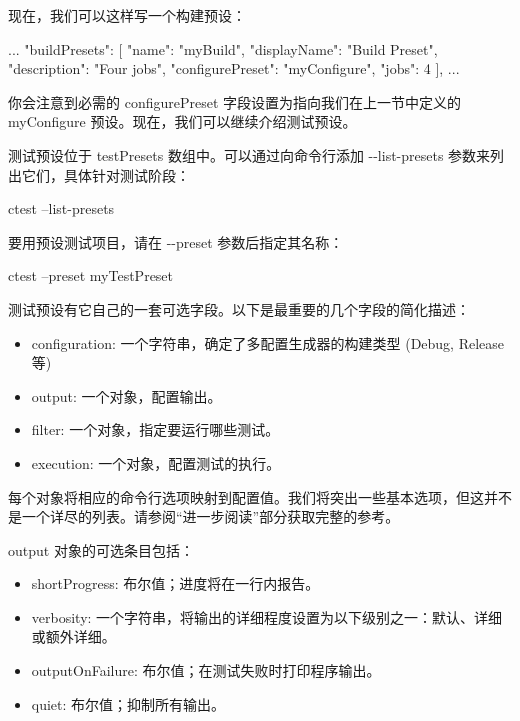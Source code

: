 现在，我们可以这样写一个构建预设：


\begin{json}
...
    "buildPresets": [
        {
            "name": "myBuild",
            "displayName": "Build Preset",
            "description": "Four jobs",
            "configurePreset": "myConfigure",
            "jobs": 4
        }
    ],
...
\end{json}

你会注意到必需的 configurePreset 字段设置为指向我们在上一节中定义的 myConfigure 预设。现在，我们可以继续介绍测试预设。


测试预设位于 testPresets 数组中。可以通过向命令行添加 -{}-list-presets 参数来列出它们，具体针对测试阶段：

\begin{shell}
ctest --list-presets
\end{shell}

要用预设测试项目，请在 -{}-preset 参数后指定其名称：

\begin{shell}
ctest --preset myTestPreset
\end{shell}

测试预设有它自己的一套可选字段。以下是最重要的几个字段的简化描述：

\begin{itemize}
\item
configuration: 一个字符串，确定了多配置生成器的构建类型 (Debug, Release等)

\item
output: 一个对象，配置输出。

\item
filter: 一个对象，指定要运行哪些测试。

\item
execution: 一个对象，配置测试的执行。
\end{itemize}

每个对象将相应的命令行选项映射到配置值。我们将突出一些基本选项，但这并不是一个详尽的列表。请参阅“进一步阅读”部分获取完整的参考。

output 对象的可选条目包括：

\begin{itemize}
\item
shortProgress: 布尔值；进度将在一行内报告。

\item
verbosity:  一个字符串，将输出的详细程度设置为以下级别之一：默认、详细或额外详细。

\item
outputOnFailure: 布尔值；在测试失败时打印程序输出。

\item
quiet: 布尔值；抑制所有输出。
\end{itemize}

